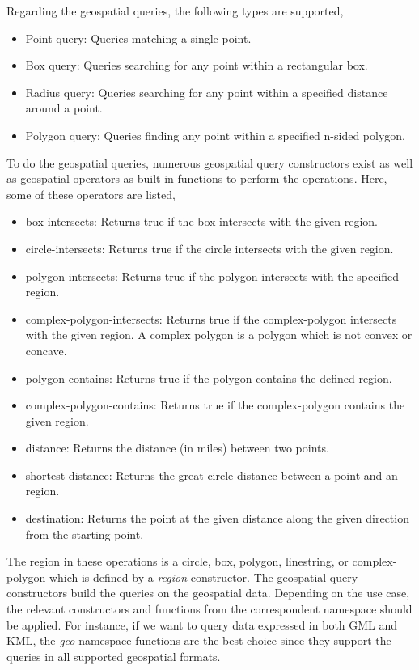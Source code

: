 \documentclass[a4paper,12pt]{article}
\begin{document}
Regarding the geospatial queries, the following types are supported,
\begin{itemize}
\item Point query: Queries matching a single point.
\item Box query: Queries searching for any point within a rectangular box.
\item Radius query: Queries searching for any point within a specified distance around a point.
\item Polygon query: Queries finding any point within a specified n-sided polygon.
\end{itemize}
To do the geospatial queries, numerous geospatial query constructors exist as well as geospatial operators as built-in functions to perform the operations.
Here, some of these operators are listed,
\begin{itemize}
\item box-intersects: Returns true if the box intersects with the given region.
\item circle-intersects: Returns true if the circle intersects with the given region.
\item polygon-intersects: Returns true if the polygon intersects with the specified region.
\item complex-polygon-intersects: Returns true if the complex-polygon intersects with the given region. A complex polygon is a polygon which is not convex or concave.
\item polygon-contains: Returns true if the polygon contains the defined region.
\item complex-polygon-contains: Returns true if the complex-polygon contains the given region.
\item distance: Returns the distance (in miles) between two points.
\item shortest-distance: Returns the great circle distance between a point and an region. 
\item destination: Returns the point at the given distance along the given direction from the starting point.
\end{itemize}
The region in these operations is a circle, box, polygon, linestring, or complex-polygon 
which is defined by a \textit{region} constructor.
The geospatial query constructors build the queries on the geospatial data. 
Depending on the use case, the relevant constructors and functions from the correspondent namespace should be applied. For instance, if we want to query data expressed in both GML and KML, the \textit{geo} namespace functions are the best choice since they support the queries in all supported geospatial formats.
\end{document}
